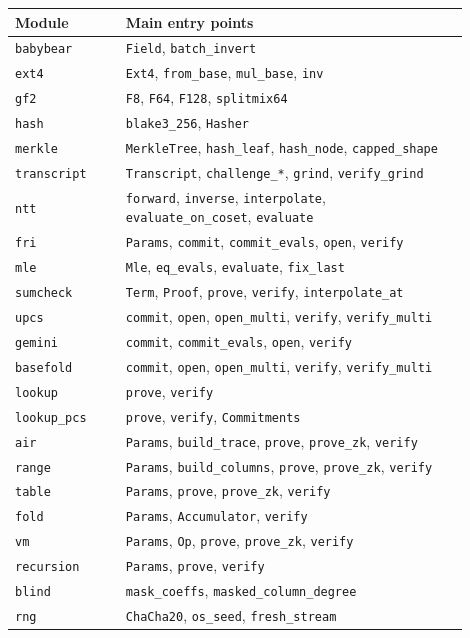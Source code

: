\documentclass[11pt,a4paper]{article}
\begin{document}
\begin{longtable}{@{}L{0.22\linewidth}L{0.68\linewidth}@{}}
\toprule
Module & Main entry points \\
\midrule
\endhead
\texttt{babybear} & \texttt{Field}, \texttt{batch\_invert} \\
\texttt{ext4} & \texttt{Ext4}, \texttt{from\_base}, \texttt{mul\_base}, \texttt{inv} \\
\texttt{gf2} & \texttt{F8}, \texttt{F64}, \texttt{F128}, \texttt{splitmix64} \\
\texttt{hash} & \texttt{blake3\_256}, \texttt{Hasher} \\
\texttt{merkle} & \texttt{MerkleTree}, \texttt{hash\_leaf}, \texttt{hash\_node}, \texttt{capped\_shape} \\
\texttt{transcript} & \texttt{Transcript}, \texttt{challenge\_*}, \texttt{grind}, \texttt{verify\_grind} \\
\texttt{ntt} & \texttt{forward}, \texttt{inverse}, \texttt{interpolate}, \texttt{evaluate\_on\_coset}, \texttt{evaluate} \\
\texttt{fri} & \texttt{Params}, \texttt{commit}, \texttt{commit\_evals}, \texttt{open}, \texttt{verify} \\
\texttt{mle} & \texttt{Mle}, \texttt{eq\_evals}, \texttt{evaluate}, \texttt{fix\_last} \\
\texttt{sumcheck} & \texttt{Term}, \texttt{Proof}, \texttt{prove}, \texttt{verify}, \texttt{interpolate\_at} \\
\texttt{upcs} & \texttt{commit}, \texttt{open}, \texttt{open\_multi}, \texttt{verify}, \texttt{verify\_multi} \\
\texttt{gemini} & \texttt{commit}, \texttt{commit\_evals}, \texttt{open}, \texttt{verify} \\
\texttt{basefold} & \texttt{commit}, \texttt{open}, \texttt{open\_multi}, \texttt{verify}, \texttt{verify\_multi} \\
\texttt{lookup} & \texttt{prove}, \texttt{verify} \\
\texttt{lookup\_pcs} & \texttt{prove}, \texttt{verify}, \texttt{Commitments} \\
\texttt{air} & \texttt{Params}, \texttt{build\_trace}, \texttt{prove}, \texttt{prove\_zk}, \texttt{verify} \\
\texttt{range} & \texttt{Params}, \texttt{build\_columns}, \texttt{prove}, \texttt{prove\_zk}, \texttt{verify} \\
\texttt{table} & \texttt{Params}, \texttt{prove}, \texttt{prove\_zk}, \texttt{verify} \\
\texttt{fold} & \texttt{Params}, \texttt{Accumulator}, \texttt{verify} \\
\texttt{vm} & \texttt{Params}, \texttt{Op}, \texttt{prove}, \texttt{prove\_zk}, \texttt{verify} \\
\texttt{recursion} & \texttt{Params}, \texttt{prove}, \texttt{verify} \\
\texttt{blind} & \texttt{mask\_coeffs}, \texttt{masked\_column\_degree} \\
\texttt{rng} & \texttt{ChaCha20}, \texttt{os\_seed}, \texttt{fresh\_stream} \\
\bottomrule
\end{longtable}
\end{document}
